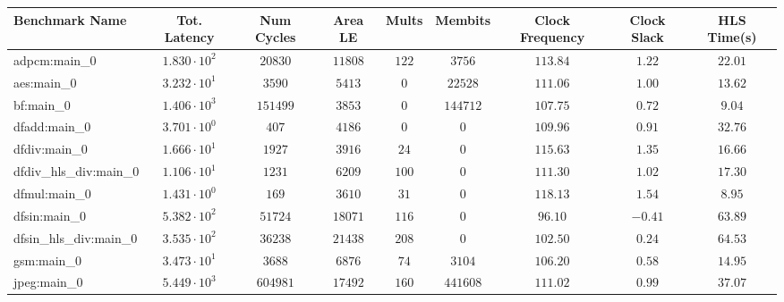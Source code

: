 \begin{tabular}{|l|c|c|c|c|c|c|c|c|}
\hline
Benchmark Name          & Tot. Latency           & Num Cycles  & Area LE    & Mults   & Membits    & Clock Frequency & Clock Slack & HLS Time(s) \\
\hline
adpcm:main\_0           & $ 1.830 \cdot 10^{2} $ & $ 20830   $ & $ 11808  $ & $ 122 $ & $ 3756   $ & $ 113.84      $ & $ 1.22    $ & $ 22.01   $ \\
aes:main\_0             & $ 3.232 \cdot 10^{1} $ & $ 3590    $ & $ 5413   $ & $ 0   $ & $ 22528  $ & $ 111.06      $ & $ 1.00    $ & $ 13.62   $ \\
bf:main\_0              & $ 1.406 \cdot 10^{3} $ & $ 151499  $ & $ 3853   $ & $ 0   $ & $ 144712 $ & $ 107.75      $ & $ 0.72    $ & $ 9.04    $ \\
dfadd:main\_0           & $ 3.701 \cdot 10^{0} $ & $ 407     $ & $ 4186   $ & $ 0   $ & $ 0      $ & $ 109.96      $ & $ 0.91    $ & $ 32.76   $ \\
dfdiv:main\_0           & $ 1.666 \cdot 10^{1} $ & $ 1927    $ & $ 3916   $ & $ 24  $ & $ 0      $ & $ 115.63      $ & $ 1.35    $ & $ 16.66   $ \\
dfdiv\_hls\_div:main\_0 & $ 1.106 \cdot 10^{1} $ & $ 1231    $ & $ 6209   $ & $ 100 $ & $ 0      $ & $ 111.30      $ & $ 1.02    $ & $ 17.30   $ \\
dfmul:main\_0           & $ 1.431 \cdot 10^{0} $ & $ 169     $ & $ 3610   $ & $ 31  $ & $ 0      $ & $ 118.13      $ & $ 1.54    $ & $ 8.95    $ \\
dfsin:main\_0           & $ 5.382 \cdot 10^{2} $ & $ 51724   $ & $ 18071  $ & $ 116 $ & $ 0      $ & $ 96.10       $ & $ -0.41   $ & $ 63.89   $ \\
dfsin\_hls\_div:main\_0 & $ 3.535 \cdot 10^{2} $ & $ 36238   $ & $ 21438  $ & $ 208 $ & $ 0      $ & $ 102.50      $ & $ 0.24    $ & $ 64.53   $ \\
gsm:main\_0             & $ 3.473 \cdot 10^{1} $ & $ 3688    $ & $ 6876   $ & $ 74  $ & $ 3104   $ & $ 106.20      $ & $ 0.58    $ & $ 14.95   $ \\
jpeg:main\_0            & $ 5.449 \cdot 10^{3} $ & $ 604981  $ & $ 17492  $ & $ 160 $ & $ 441608 $ & $ 111.02      $ & $ 0.99    $ & $ 37.07   $ \\

\end{tabular}
